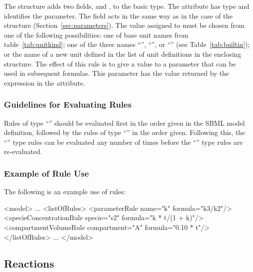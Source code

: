 \documentclass[10pt]{cekarticle}
\begin{document}
The  structure adds two fields,  and
, to the basic  type.  The
 attribute has type  and identifies the
parameter.  The  field acts in the same way as in the case of
the  structure (Section~\ref{sec:parameters}).  The value
assigned to  must be chosen from one of the following
possibilities: one of base unit names from table~\ref{tab:unitkind}; one of
the three names ``'', ``'', or
``'' (see Table~\ref{tab:builtin}); or the name of a new
unit defined in the list of unit definitions in the enclosing 
structure.  The effect of this rule is to give a value to a parameter that
can be used in subsequent formulas.  This parameter has the value returned
by the expression in the  attribute.


\subsubsection{Guidelines for Evaluating Rules}

Rules of type ``'' should be evaluated first in the order
given in the SBML model definition, followed by the rules of type
``'' in the order given.  Following this, the ``''
type rules can be evaluated any number of times before the
``'' type rules are re-evaluated.


\subsubsection{Example of Rule Use}

The following is an example use of rules:

\begin{example}
<model>
    ...
    <listOfRules>
        <parameterRule name="k" formula="k3/k2"/>
        <specieConcentrationRule specie="s2" formula="k * t/(1 + k)"/>
        <compartmentVolumeRule compartment="A" formula="0.10 * t"/>
    </listOfRules>
    ...
</model> 
\end{example}


\subsection{Reactions}
\label{sec:reactions}
\end{document}
